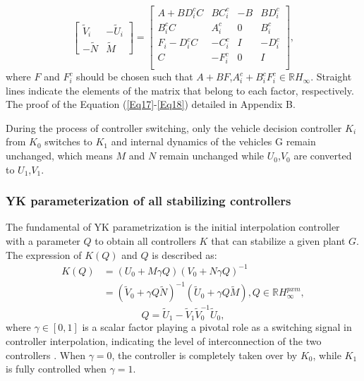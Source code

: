 \documentclass[journal]{IEEEtran}
\begin{document}
\begin{equation}
  \left[\begin{array}{cc}
      \tilde{V}_{i} & -\tilde{U}_{i} \\
      -\tilde{N}    & \tilde{M}
    \end{array}\right]=\left[\begin{array}{cc|cc}
      A+B  D_{i}^{c} C          & B  C_{i}^{c} & -B & B  D_{i}^{c} \\
      B_{i}^{c} C               & A_{i}^{c}    & 0  & B_{i}^{c}    \\
      \hline F_{i}- D_{i}^{c} C & -C_{i}^{c}   & I  & -D_{i}^{c}   \\
      C                         & -F_{i}^{c}   & 0  & I            \\
    \end{array}\right],
  \label{Eq18}
\end{equation}
where $F$ and $F_i^c$ should be chosen such that $A+BF$,$A_i^c+B_i^c F_i^c\in \mathbb{R} H_{\infty}$. Straight lines indicate the elements of the matrix that belong to each factor, respectively. The proof of the Equation (\ref{Eq17}-\ref{Eq18}) detailed in Appendix B.

During the process of controller switching, only the vehicle decision controller $K_i$ from $K_0$ switches to $K_1$ and internal dynamics of the vehicles G remain unchanged, which means $M$ and $N$ remain unchanged while $U_0$,$V_0$ are converted to $U_1$,$V_1$.

\subsubsection{YK parameterization of all stabilizing controllers}
\label{Section 3.2.3}

The fundamental of YK parametrization is the initial interpolation controller with a parameter $Q$ to obtain all controllers $K$ that can stabilize a given plant $G$. The expression of $K(Q)$ and $Q$ is described as:
\begin{equation}
  \begin{aligned}
    K(Q) & =  \left(U_{0}+M \gamma Q\right)\left(V_{0}+N \gamma Q\right)^{-1}                                                                     \\
         & =\left(\tilde{V}_{0}+\gamma Q \tilde{N}\right)^{-1}\left(\tilde{U}_{0}+\gamma Q \tilde{M}\right), Q \in \mathbb{R} H_{\infty}^{p x m},
  \end{aligned}
\end{equation}
\begin{equation}
  Q=\tilde{U}_{1}-\tilde{V}_{1} \tilde{V}_{0}^{-1} \tilde{U}_{0},
  \label{Eq20}
\end{equation}
where $\gamma \in [0,1]$ is a scalar factor playing a pivotal role as a switching signal in controller interpolation, indicating the level of interconnection of the two controllers \citep{niemann1999architecture}. When $\gamma=0$, the controller is completely taken over by $K_0$, while $K_1$ is fully controlled when $\gamma=1$.
\end{document}

